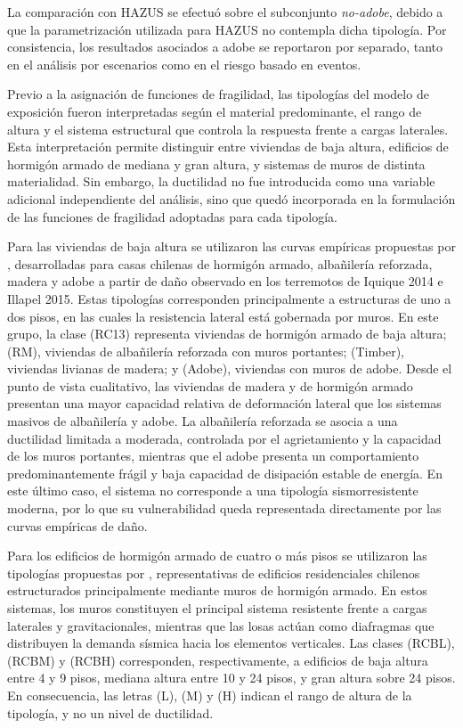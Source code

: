La comparación con HAZUS se efectuó sobre el subconjunto \textit{no-adobe}, debido a que la parametrización utilizada para HAZUS no contempla dicha tipología. Por consistencia, los resultados asociados a adobe se reportaron por separado, tanto en el análisis por escenarios como en el riesgo basado en eventos.

Previo a la asignación de funciones de fragilidad, las tipologías del modelo de exposición fueron interpretadas según el material predominante, el rango de altura y el sistema estructural que controla la respuesta frente a cargas laterales. Esta interpretación permite distinguir entre viviendas de baja altura, edificios de hormigón armado de mediana y gran altura, y sistemas de muros de distinta materialidad. Sin embargo, la ductilidad no fue introducida como una variable adicional independiente del análisis, sino que quedó incorporada en la formulación de las funciones de fragilidad adoptadas para cada tipología.

Para las viviendas de baja altura se utilizaron las curvas empíricas propuestas por , desarrolladas para casas chilenas de hormigón armado, albañilería reforzada, madera y adobe a partir de daño observado en los terremotos de Iquique 2014 e Illapel 2015. Estas tipologías corresponden principalmente a estructuras de uno a dos pisos, en las cuales la resistencia lateral está gobernada por muros. En este grupo, la clase (RC13) representa viviendas de hormigón armado de baja altura; (RM), viviendas de albañilería reforzada con muros portantes; (Timber), viviendas livianas de madera; y (Adobe), viviendas con muros de adobe. Desde el punto de vista cualitativo, las viviendas de madera y de hormigón armado presentan una mayor capacidad relativa de deformación lateral que los sistemas masivos de albañilería y adobe. La albañilería reforzada se asocia a una ductilidad limitada a moderada, controlada por el agrietamiento y la capacidad de los muros portantes, mientras que el adobe presenta un comportamiento predominantemente frágil y baja capacidad de disipación estable de energía. En este último caso, el sistema no corresponde a una tipología sismorresistente moderna, por lo que su vulnerabilidad queda representada directamente por las curvas empíricas de daño.

Para los edificios de hormigón armado de cuatro o más pisos se utilizaron las tipologías propuestas por , representativas de edificios residenciales chilenos estructurados principalmente mediante muros de hormigón armado. En estos sistemas, los muros constituyen el principal sistema resistente frente a cargas laterales y gravitacionales, mientras que las losas actúan como diafragmas que distribuyen la demanda sísmica hacia los elementos verticales. Las clases (RCBL), (RCBM) y (RCBH) corresponden, respectivamente, a edificios de baja altura entre 4 y 9 pisos, mediana altura entre 10 y 24 pisos, y gran altura sobre 24 pisos. En consecuencia, las letras (L), (M) y (H) indican el rango de altura de la tipología, y no un nivel de ductilidad.

